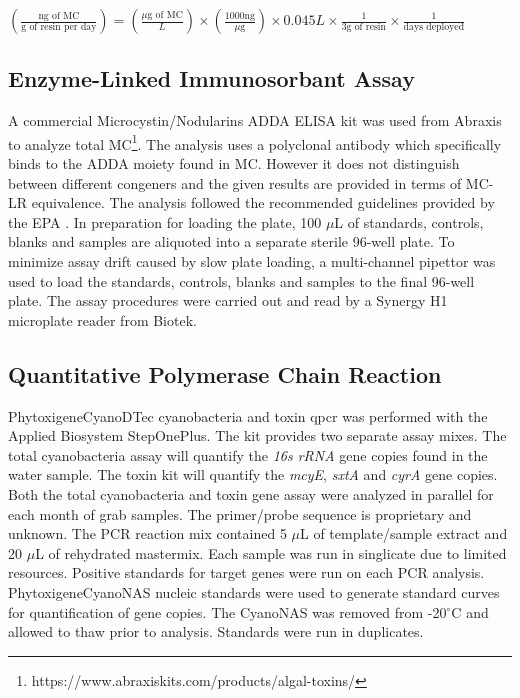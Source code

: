 \begin {center} 
$(\frac{\text{ng of MC}}{\text{g of resin per day}}) =(\frac{\text{$\mu$g of MC}}{L}) \times (\frac{\text{1000ng}}{\text{$\mu$g}}) \times {0.045L} \times \frac{1}{\text{3g of resin}} \times \frac{1}{\text{days deployed}}$
\end{center}



\subsection{Enzyme-Linked Immunosorbant Assay}

A commercial Microcystin/Nodularins ADDA ELISA kit was used from Abraxis to analyze total MC\footnote{https://www.abraxiskits.com/products/algal-toxins/}. The analysis uses a polyclonal antibody which specifically binds to the ADDA moiety found in MC. However it does not distinguish between different congeners and the given results are provided in terms of MC-LR equivalence. The analysis followed the recommended guidelines provided by the EPA \cite{usepa_method_2016}. In preparation for loading the plate,  100 $\mu$L of standards, controls, blanks and samples are aliquoted into a separate sterile 96-well plate. To minimize assay drift caused by slow plate loading, a multi-channel pipettor was used to load the standards, controls, blanks and samples to the final 96-well plate. The assay procedures were carried out and read by a Synergy H1 microplate reader from Biotek.

\subsection{Quantitative Polymerase Chain Reaction}

Phytoxigene\texttrademark  CyanoDTec cyanobacteria and toxin \gls{qpcr} was performed with the Applied Biosystem StepOnePlus\texttrademark. The kit provides two separate assay mixes. The total cyanobacteria assay will quantify the \emph{16s rRNA} gene copies found in the water sample. The toxin kit will quantify the \emph{mcyE}, \emph{sxtA} and \emph{cyrA} gene copies.  Both the total cyanobacteria and toxin gene assay were analyzed in parallel for each month of grab samples. The primer/probe sequence is proprietary and unknown.  The PCR reaction mix contained 5 $\mu$L of template/sample extract and 20 $\mu$L of rehydrated mastermix.  Each sample was run in singlicate due to limited resources. Positive standards for target genes  were run on each PCR analysis. Phytoxigene\texttrademark  CyanoNAS nucleic standards were used to generate standard curves for quantification of gene copies. The CyanoNAS was removed from -20$^\circ$C and allowed to thaw prior to analysis.  Standards were run in duplicates.

